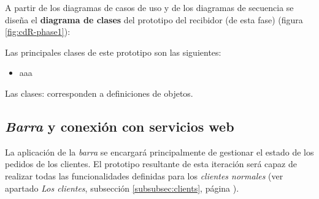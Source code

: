 A partir de los diagramas de casos de uso y de los diagramas de secuencia se
diseña el \textbf{diagrama de clases} del prototipo del recibidor (de esta
fase) (figura \ref{fig:cdR-phase1}):


Las principales clases de este prototipo son las siguientes:
\begin{itemize}
\item aaa
\end{itemize}
Las clases: %
corresponden a definiciones de objetos.

\subsection{\emph{Barra} y conexión con servicios web}
La aplicación de la \emph{barra} se encargará principalmente de gestionar el
estado de los pedidos de los clientes. El prototipo resultante de esta
iteración será capaz de realizar todas las funcionalidades definidas para
los \emph{clientes normales} (ver apartado \emph{Los clientes},
subsección \ref{subsubsec:clients}, página \pageref{subsubsec:clients}).

